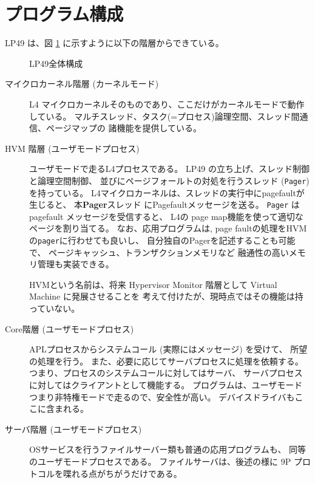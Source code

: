 \documentclass{ipsjpapers}
\begin{document}

\section{プログラム構成}

      LP49 は、図 \ref{fig:LP49general} に示すように以下の階層からできている。

\begin{figure}[hbt]
  \begin{center}
   \epsfxsize=340pt
    \caption{LP49全体構成}
    \label{fig:LP49general}
  \end{center}
\end{figure}


\begin{description}
\item[マイクロカーネル階層  (カーネルモード)]
       L4 マイクロカーネルそのものであり、ここだけがカーネルモードで動作している。
       マルチスレッド、タスク(=プロセス)論理空間、スレッド間通信、ページマップの
       諸機能を提供している。
    
\item[HVM 階層 (ユーザモードプロセス)]
     ユーザモードで走るL4プロセスである。
     LP49 の立ち上げ、スレッド制御と論理空間制御、
    並びにページフォールトの対処を行うスレッド ({\tt Pager}) を持っている。
%
    L4マイクロカーネルは、スレッドの実行中にpagefaultが生じると、
    本{\bf Pager}スレッド にPagefaultメッセージを送る。
   {\tt Pager} は pagefault メッセージを受信すると、
   L4の page map機能を使って適切なページを割り当てる。
   なお、応用プログラムは, page faultの処理をHVMの{\tt pager}に行わせても良いし、
   自分独自のPagerを記述することも可能で、
   ページキャッシュ、トランザクションメモリなど
   融通性の高いメモリ管理も実装できる。


    HVMという名前は、将来 Hypervisor Monitor 階層として Virtual Machine に発展させることを
    考えて付けたが、現時点ではその機能は持っていない。

    
\item[Core階層  (ユーザモードプロセス)]
     APLプロセスからシステムコール (実際にはメッセージ) を受けて、
    所望の処理を行う。
   また、必要に応じてサーバプロセスに処理を依頼する。
   つまり、プロセスのシステムコールに対してはサーバ、
   サーバプロセスに対してはクライアントとして機能する。
%   
    プログラムは、ユーザモードつまり非特権モードで走るので、安全性が高い。
    デバイスドライバもここに含まれる。

    
\item[サーバ階層 (ユーザモードプロセス)]
       OSサービスを行うファイルサーバー類も普通の応用プログラムも、
     同等のユーザモードプロセスである。
    ファイルサーバは、後述の様に 9P プロトコルを喋れる点がちがうだけである。 
\end{description}
\end{document}
